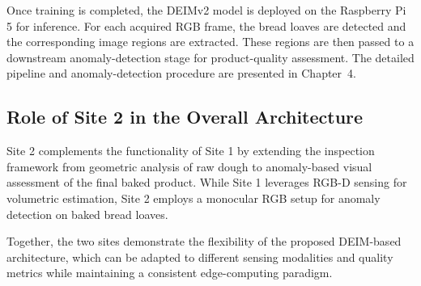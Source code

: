 Once training is completed, the DEIMv2 model is deployed on the Raspberry Pi 5 \cite{raspberrypi_raspberry_pi_5_2026} for inference. For each acquired RGB frame, the bread loaves are detected and the corresponding image regions are extracted. These regions are then passed to a downstream anomaly-detection stage for product-quality assessment. The detailed pipeline and anomaly-detection procedure are presented in Chapter~4.

\subsection{Role of Site 2 in the Overall Architecture}

Site 2 complements the functionality of Site 1 by extending the inspection framework from geometric analysis of raw dough to anomaly-based visual assessment of the final baked product. While Site 1 leverages RGB-D sensing for volumetric estimation, Site 2 employs a monocular RGB setup for anomaly detection on baked bread loaves.

Together, the two sites demonstrate the flexibility of the proposed DEIM-based architecture, which can be adapted to different sensing modalities and quality metrics while maintaining a consistent edge-computing paradigm.

